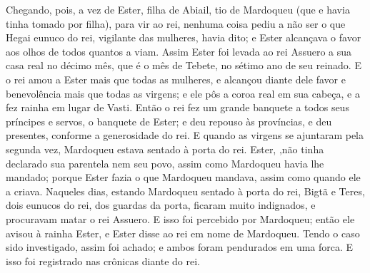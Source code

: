 {Chegando, pois, a vez de Ester, filha de Abiail, tio de Mardoqueu (que e havia tinha tomado por filha), para vir ao rei, nenhuma coisa pediu a não ser o que Hegai eunuco do rei, vigilante das mulheres, havia dito; e Ester alcançava o favor aos olhos de todos quantos a viam.
Assim Ester foi levada ao rei Assuero a sua casa real no décimo mês, que é o mês de Tebete, no sétimo ano de seu reinado.
E o rei amou a Ester mais que todas as mulheres, e alcançou diante dele favor e benevolência mais que todas as virgens; e ele pôs a coroa real em sua cabeça, e a fez rainha em lugar de Vasti.
Então o rei fez um grande banquete a todos seus príncipes e servos, o banquete de Ester; e deu repouso às províncias, e deu presentes, conforme a generosidade do rei.
E quando as virgens se ajuntaram pela segunda vez, Mardoqueu estava sentado à porta do rei.
Ester,
{} ,não tinha declarado sua parentela nem seu povo, assim como Mardoqueu havia lhe mandado; porque Ester fazia o que Mardoqueu mandava, assim como quando ele a criava.
Naqueles dias, estando Mardoqueu sentado à porta do rei, Bigtã e Teres, dois eunucos do rei, dos guardas da porta, ficaram muito indignados, e procuravam matar
 o rei Assuero.
E isso foi percebido por Mardoqueu; então ele avisou à rainha Ester, e Ester disse ao rei em nome de Mardoqueu.
Tendo o caso sido investigado, assim foi achado; e ambos foram pendurados em uma forca. E isso foi registrado nas crônicas diante do rei.

}
